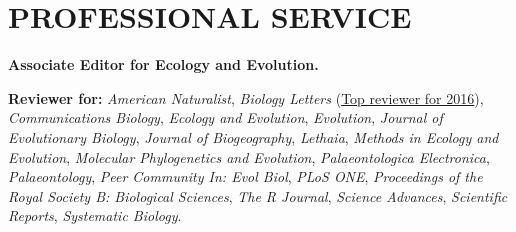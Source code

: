 \documentclass[10pt,a4paper]{article}
\begin{document}
{%


\bigskip


\section{PROFESSIONAL SERVICE}

\raggedright\textbf{Associate Editor for Ecology and Evolution.}

\raggedright\textbf{Reviewer for:} %
\textit{American Naturalist},
\textit{Biology Letters} (\href{http://blogs.royalsociety.org/publishing/biology-letters-top-reviewers-from-2016/}{Top reviewer for 2016}),
\textit{Communications Biology},
\textit{Ecology and Evolution},
\textit{Evolution},
\textit{Journal of Evolutionary Biology},
\textit{Journal of Biogeography},
\textit{Lethaia},
\textit{Methods in Ecology and Evolution},
\textit{Molecular Phylogenetics and Evolution},
\textit{Palaeontologica Electronica},
\textit{Palaeontology},
\textit{Peer Community In: Evol Biol},
\textit{PLoS ONE},
\textit{Proceedings of the Royal Society B: Biological Sciences},
\textit{The R Journal},
\textit{Science Advances},
\textit{Scientific Reports},
\textit{Systematic Biology}.

}
\end{document}

